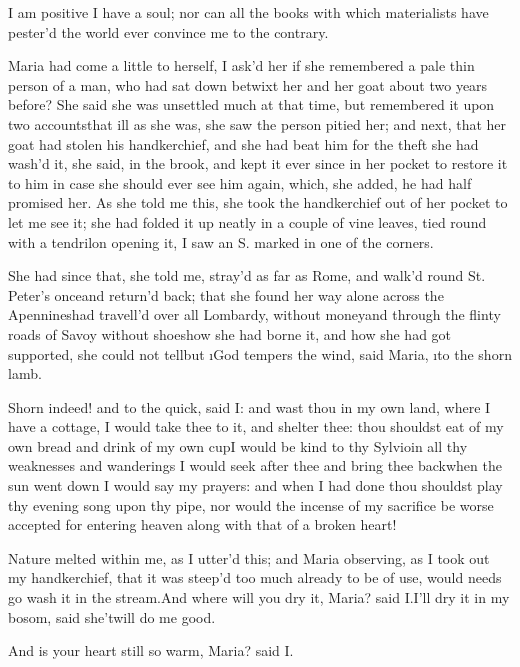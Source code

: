 \documentclass[twoside]{article}
\begin{document}
I am positive I have a soul; nor can all
the books with which materialists have
pester’d the world ever convince me to the
contrary.





\vskip 6pt


 Maria had come a little
to herself, I ask’d her if she remembered
a pale thin person of a man, who had sat
down betwixt her and her goat about two
years before?  She said she was unsettled
much at that time, but remembered it upon
two accounts\tskk that ill as she was,
she saw the person pitied her; and next,
that her goat had stolen his handkerchief,
and she had beat him for the theft\tskk
she had wash’d it, she said, in the brook,
and kept it ever since in her pocket to
restore it to him in case she should ever
see him again, which, she added, he had
half promised her.  As she told me this,
she took the handkerchief out of her
pocket to let me see it; she had folded it
up neatly in a couple of vine leaves, tied
round with a tendril\tskk on opening it,
I saw an S. marked in one of the corners.

She had since that, she told me, stray’d
as far as Rome, and walk’d round St.
Peter’s once\tskk and return’d back;\tskk
that she found her way alone across the
Apennines\tskk had travell’d over all
Lombardy, without money\tskk and through
the flinty roads of Savoy without
shoes\tskk how she had borne it, and how
she had got supported, she could not
tell\tskk but \i{God tempers the wind},
said Maria, \i{to the shorn lamb}.

Shorn indeed! and to the quick, said I:
and wast thou in my own land, where I have
a cottage, I would take thee to it, and
shelter thee: thou shouldst eat of my own
bread and drink of my own cup\tskk I
would be kind to thy Sylvio\tskk in all
thy weaknesses and wanderings I would seek
after thee and bring thee back\tskk when
the sun went down I would say my prayers:
and when I had done thou shouldst play thy
evening song upon thy pipe, nor would the
incense of my sacrifice be worse accepted
for entering heaven along with that of a
broken heart!

Nature melted within me, as I utter’d
this; and Maria observing, as I took out
my handkerchief, that it was steep’d too
much already to be of use, would needs go
wash it in the stream.\tskk And where will
you dry it, Maria? said I.\tskk I’ll dry
it in my bosom, said she\tskk ’twill do
me good.

And is your heart still so warm, Maria?
said I.
\end{document}

